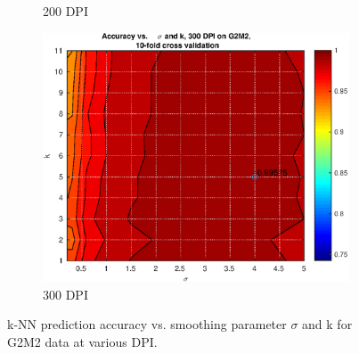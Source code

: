 \begin{figure}[ht]
\begin{subfigure}{0.46\textwidth}
		\caption{200 DPI}
	\end{subfigure}
	\begin{subfigure}{0.46\textwidth}
		\includegraphics[width = \textwidth]{img/knn-AccVsKVsSigma-G2M2-dpi300-cv10}
		\caption{300 DPI}
	\end{subfigure}
	\caption[k-NN prediction accuracy vs. smoothing parameter $\sigma$
			and k at various DPI.]{
		k-NN prediction accuracy vs. smoothing parameter $\sigma$
		and k for G2M2 data at various DPI.
		}
	\label{fig:knn-AccVsKVsSigma-G2M2}
\end{figure}

\clearpage
